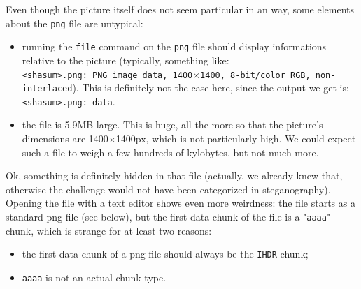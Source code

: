 \documentclass[12pt,a4paper]{article}
\begin{document}
    \begin{figure}[H]
        \begin{center}
        \end{center}
    \end{figure}

    Even though the picture itself does not seem particular in an way, some elements about the \texttt{png} file are untypical:
    \begin{itemize}
        \item[\bullet] running the \texttt{file} command on the \texttt{png} file should display informations relative to the picture (typically, something like:\\
            \texttt{<shasum>.png: PNG image data, 1400$\times$1400, 8-bit/color RGB, non-interlaced}).
            This is definitely not the case here, since the output we get is:\\
            \texttt{<shasum>.png: data}.
        \item[\bullet] the file is 5.9MB large. This is huge, all the more so
            that the picture's dimensions are 1400$\times$1400px, which is not
            particularly high. We could expect such a file to weigh a few
            hundreds of kylobytes, but not much more.
    \end{itemize}

    \vspace{1em}
    Ok, something is definitely hidden in that file (actually, we already knew that, otherwise the challenge would not have been categorized in steganography).\\

    Opening the file with a text editor shows even more weirdness: the file starts as a standard png file (see below), but the first data chunk of the file is a "\texttt{aaaa}" chunk, which is strange for at least two reasons:
    \begin{itemize}
        \item[\bullet] the first data chunk of a png file should always be the \texttt{IHDR} chunk;
        \item[\bullet] \texttt{aaaa} is not an actual chunk type.
    \end{itemize}
\end{document}
